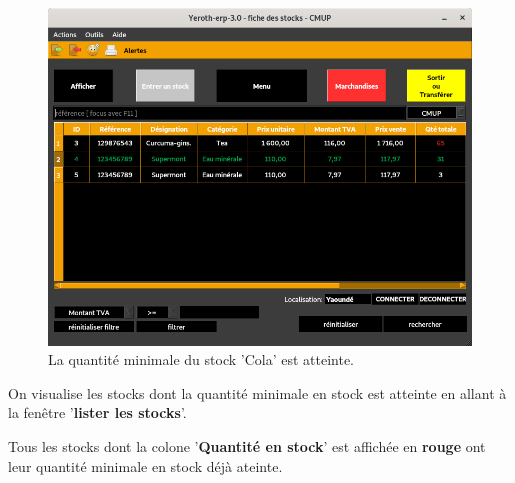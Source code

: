 \begin{figure}[!htbp]
	\centering
	\includegraphics[scale=0.63]{images/yeren-fenetre-stock-minimal-atteint.png}
	\caption{La quantit\'e minimale du stock 'Cola' est atteinte.}
	\label{fig:fenetre-lister-quantite-minimale}
\end{figure}

On visualise les stocks dont la quantit\'e minimale en stock
est atteinte en allant \`a la fen\^etre '\textbf{lister les stocks}'.

Tous les stocks dont la colone '\textbf{Quantit\'e en stock}'
est affich\'ee en \textbf{\textcolor{firebrickred}{rouge}}
ont leur quantit\'e minimale en stock d\'ej\`a ateinte.


{}

